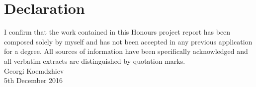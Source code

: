 \chapter{Declaration}
I confirm that the work contained in this Honours project report has been composed solely by myself and has not been accepted in any previous application for a degree. All sources of information have been specifically acknowledged and all verbatim extracts are distinguished by quotation marks.\\[2cm]

  \noindent Georgi Koemdzhiev\\
  5th December 2016